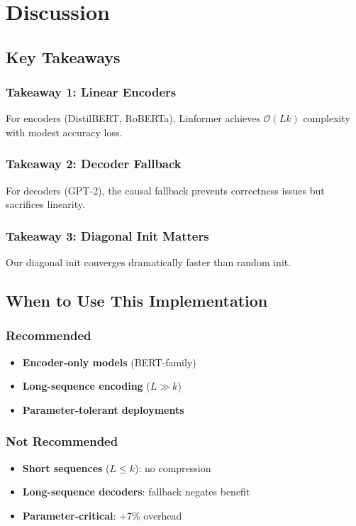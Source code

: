 \section{Discussion}

\subsection{Key Takeaways}

\subsubsection{Takeaway 1: Linear Encoders}

For encoders (DistilBERT, RoBERTa), Linformer achieves $\mathcal{O}(L k)$ 
complexity with modest accuracy loss.

\subsubsection{Takeaway 2: Decoder Fallback}

For decoders (GPT-2), the causal fallback prevents correctness issues but 
sacrifices linearity.

\subsubsection{Takeaway 3: Diagonal Init Matters}

Our diagonal init converges dramatically faster than random init.

\subsection{When to Use This Implementation}

\subsubsection{Recommended}
\begin{itemize}
\item \textbf{Encoder-only models} (BERT-family)
\item \textbf{Long-sequence encoding} ($L \gg k$)
\item \textbf{Parameter-tolerant deployments}

\end{itemize}
\subsubsection{Not Recommended}
\begin{itemize}
\item \textbf{Short sequences} ($L \leq k$): no compression
\item \textbf{Long-sequence decoders}: fallback negates benefit
\item \textbf{Parameter-critical}: +7\% overhead

\end{itemize}
